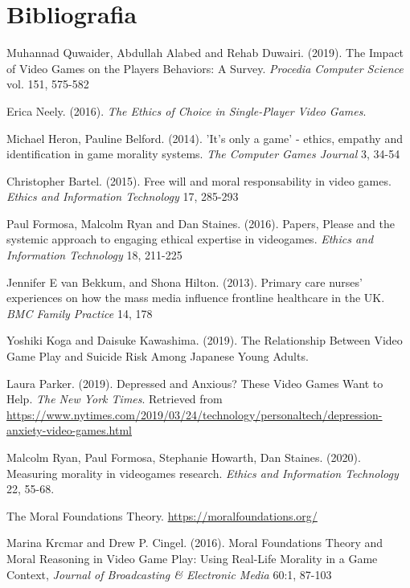 \section{Bibliografia}
\begin{thebibliography}{H}
    Muhannad Quwaider, Abdullah Alabed and Rehab Duwairi. (2019). The Impact of Video Games on the Players Behaviors: A Survey. \textit{Procedia Computer Science} vol. 151, 575-582

	Erica Neely. (2016). \textit{The Ethics of Choice in Single-Player Video Games}. 
	
	Michael Heron, Pauline Belford. (2014). 'It's only a game' - ethics, empathy and identification in game morality systems. \textit{The Computer Games Journal} 3, 34-54
	
	Christopher Bartel. (2015). Free will and moral responsability in video games. \textit{Ethics and Information Technology} 17, 285-293
	
	Paul Formosa, Malcolm Ryan and Dan Staines. (2016). Papers, Please and the systemic approach to engaging ethical expertise in videogames. \textit{Ethics and Information Technology} 18, 211-225
	
	Jennifer E van Bekkum, and Shona Hilton. (2013). Primary care nurses' experiences on how the mass media influence frontline healthcare in the UK. \textit{BMC Family Practice} 14, 178
	
	Yoshiki Koga and Daisuke Kawashima. (2019). The Relationship Between Video Game Play and Suicide Risk Among Japanese Young Adults.
	
	Laura Parker. (2019). Depressed and Anxious? These Video Games Want to Help. \textit{The New York Times}. Retrieved from \url{https://www.nytimes.com/2019/03/24/technology/personaltech/depression-anxiety-video-games.html}
	
	Malcolm Ryan, Paul Formosa, Stephanie Howarth, Dan Staines. (2020). Measuring morality in videogames research. \textit{Ethics and Information Technology} 22, 55-68.
	
	The Moral Foundations Theory. \url{https://moralfoundations.org/}
	
	Marina Krcmar and Drew P. Cingel. (2016). Moral Foundations Theory and Moral Reasoning in Video Game Play: Using Real-Life Morality in a Game Context, \textit{Journal of Broadcasting \& Electronic Media} 60:1, 87-103
	

\end{thebibliography}
